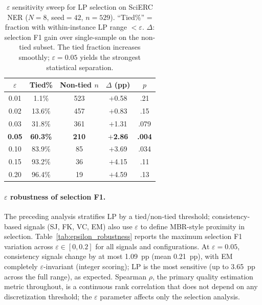 \begin{table}[t]
\centering
\small
\caption{$\varepsilon$ sensitivity sweep for LP selection on SciERC NER ($N{=}8$, seed${=}42$, $n{=}529$). ``Tied\%'' = fraction with within-instance LP range ${<}\varepsilon$. $\Delta$: selection F1 gain over single-sample on the non-tied subset. The tied fraction increases smoothly; $\varepsilon{=}0.05$ yields the strongest statistical separation.}
\label{tab:epsilon_sweep}
\begin{tabular}{ccccc}
\toprule
$\varepsilon$ & Tied\% & Non-tied $n$ & $\Delta$ (pp) & $p$ \\
\midrule
0.01 & 1.1\% & 523 & $+$0.58 & .21 \\
0.02 & 13.6\% & 457 & $+$0.83 & .15 \\
0.03 & 31.8\% & 361 & $+$1.31 & .079 \\
\textbf{0.05} & \textbf{60.3\%} & \textbf{210} & \textbf{$+$2.86} & \textbf{.004} \\
0.10 & 83.9\% & 85 & $+$3.69 & .034 \\
0.15 & 93.2\% & 36 & $+$4.15 & .11 \\
0.20 & 96.4\% & 19 & $+$4.59 & .13 \\
\bottomrule
\end{tabular}
\end{table}

\paragraph{$\varepsilon$ robustness of selection F1.}\label{app:epsilon_robustness}
The preceding analysis stratifies LP by a tied/non-tied threshold; consistency-based signals (SJ, FK, VC, EM) also use $\varepsilon$ to define MBR-style proximity in selection.
Table~\ref{tab:epsilon_robustness} reports the maximum selection F1 variation across $\varepsilon \in [0, 0.2]$ for all signals and configurations.
At $\varepsilon{=}0.05$, consistency signals change by at most 1.09~pp (mean 0.21~pp), with EM completely $\varepsilon$-invariant (integer scoring); LP is the most sensitive (up to 3.65~pp across the full range), as expected.
Spearman $\rho$, the primary quality estimation metric throughout, is a continuous rank correlation that does not depend on any discretization threshold; the $\varepsilon$ parameter affects only the selection analysis.

